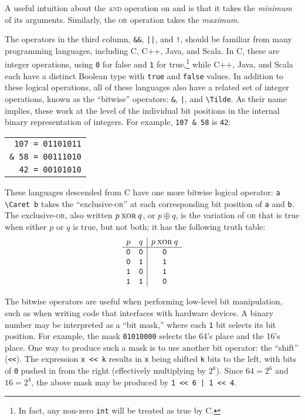 A useful intuition about the \textsc{and} operation on \0 and \1 is that it takes the \textit{minimum} of its arguments. Similarly, the \textsc{or} operation takes the \textit{maximum}.

The operators in the third column, \verb|&&|, \verb-||-, and \verb|!|, should be familiar from many programming languages, including C, C++, Java, and Scala. In C, these are integer operations, using \verb|0| for false and \verb|1| for true,\footnote{In fact, any non-zero \texttt{int} will be treated as true by C.} while C++, Java, and Scala each have a distinct Boolean type with \verb|true| and \verb|false| values. In addition to these logical operations, all of these languages also have a related set of integer operations, known as the ``bitwise'' operators: \verb|&|, \verb-|-, and \Verb|\Tilde|. As their name implies, these work at the level of the individual bit positions in the internal binary representation of integers. For example, \verb|107 & 58| is \verb|42|:
\begin{center}\begin{tabular}{c}
\verb| 107 = 01101011| \\
\verb|& 58 = 00111010| \\ \hline
\verb|  42 = 00101010|
\end{tabular}\end{center}

These languages descended from C have one more bitwise logical operator: \Verb|a \Caret b| takes the ``exclusive-\textsc{or}'' at each corresponding bit position of \verb|a| and \verb|b|. The exclusive-\textsc{or}, also written $p\mathbin{\textsc{xor}} q$, or $p\oplus q$, is the variation of \textsc{or} that is true when either $p$ or $q$ is true, but not both; it has the following truth table:
\[
\begin{array}{cc|c}
p & q & p\mathbin{\textsc{xor}} q\\ \hline
\mathtt{0} & \mathtt{0} & \mathtt{0}\\
\mathtt{0} & \mathtt{1} & \mathtt{1}\\
\mathtt{1} & \mathtt{0} & \mathtt{1}\\
\mathtt{1} & \mathtt{1} & \mathtt{0}
\end{array}
\]

The bitwise operators are useful when performing low-level bit manipulation, such as when writing code that interfaces with hardware devices. A binary number may be interpreted as a ``bit mask,'' where each \verb|1| bit selects its bit position. For example, the mask \verb|01010000| selects the 64's place and the 16's place. One way to produce such a mask is to use another bit operator: the ``shift'' (\verb|<<|). The expression \verb|x << k| results in \verb|x| being shifted \verb|k| bits to the left, with bits of \verb|0| pushed in from the right (effectively multiplying by $2^k$). Since $64=2^6$ and $16=2^4$, the above mask may be produced by \verb-1 << 6 | 1 << 4-.

